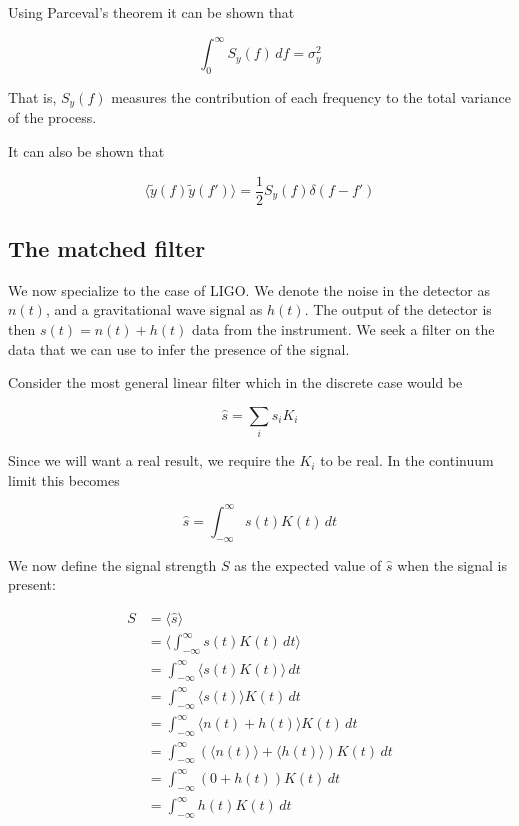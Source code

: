 Using Parceval's theorem it can be shown that

\begin{equation*}
\int_0^\infty S_y(f)\, df = \sigma^2_y
\end{equation*}

That is, $S_y(f)$ measures the contribution of each frequency 
to the total variance of the process.

It can also be shown that 

\begin{equation}
\label{eq:psd2}
\langle \tilde{y}(f) \tilde{y}(f')\rangle = \frac{1}{2} S_y(f)
\delta(f-f')
\end{equation}

\subsection{The matched filter}
\label{ssec:matched_filter}

We now specialize to the case of LIGO.  We denote the noise in the
detector as $n(t)$, and a gravitational wave signal as $h(t)$.  The
output of the detector is then $s(t)=n(t)+h(t)$ data from the
instrument.  We seek a filter on the data that we can use to infer the
presence of the signal.

Consider the most general linear filter which  in the discrete case
would be

\begin{equation}
\hat{s} = \sum_i s_i K_i
\end{equation}

Since we will want a real result, we require the $K_i$ to be real.  In
the continuum limit this becomes

\begin{equation}
\hat{s} = \int_{-\infty}^\infty s(t) K(t)\, dt
\end{equation}

We now define the signal strength $S$ as the expected value of
$\hat{s}$ when the signal is present:

\begin{align}
S &= \langle \hat{s} \rangle \\
&= \langle  \int_{-\infty}^\infty s(t) K(t)\, dt \rangle \\
&= \int_{-\infty}^\infty \langle s(t) K(t)\rangle \, dt \\
&= \int_{-\infty}^\infty \langle s(t) \rangle K(t) \, dt \\
&= \int_{-\infty}^\infty \langle n(t) + h(t) \rangle K(t) \, dt \\
&= \int_{-\infty}^\infty \left( \langle n(t) \rangle + \langle h(t)
\rangle \right)  K(t) \, dt \\
&= \int_{-\infty}^\infty \left( 0 + h(t) \right)  K(t) \, dt \\
&= \int_{-\infty}^\infty h(t) K(t) \, dt \\
\end{align}

